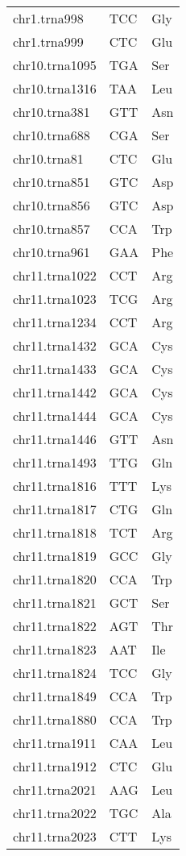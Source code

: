 \begin{longtable}{@{}l>{\collectcell\anticodon}l<{\endcollectcell}l@{}}
    chr1.trna998 & TCC & Gly \\
    chr1.trna999 & CTC & Glu \\
    chr10.trna1095 & TGA & Ser \\
    chr10.trna1316 & TAA & Leu \\
    chr10.trna381 & GTT & Asn \\
    chr10.trna688 & CGA & Ser \\
    chr10.trna81 & CTC & Glu \\
    chr10.trna851 & GTC & Asp \\
    chr10.trna856 & GTC & Asp \\
    chr10.trna857 & CCA & Trp \\
    chr10.trna961 & GAA & Phe \\
    chr11.trna1022 & CCT & Arg \\
    chr11.trna1023 & TCG & Arg \\
    chr11.trna1234 & CCT & Arg \\
    chr11.trna1432 & GCA & Cys \\
    chr11.trna1433 & GCA & Cys \\
    chr11.trna1442 & GCA & Cys \\
    chr11.trna1444 & GCA & Cys \\
    chr11.trna1446 & GTT & Asn \\
    chr11.trna1493 & TTG & Gln \\
    chr11.trna1816 & TTT & Lys \\
    chr11.trna1817 & CTG & Gln \\
    chr11.trna1818 & TCT & Arg \\
    chr11.trna1819 & GCC & Gly \\
    chr11.trna1820 & CCA & Trp \\
    chr11.trna1821 & GCT & Ser \\
    chr11.trna1822 & AGT & Thr \\
    chr11.trna1823 & AAT & Ile \\
    chr11.trna1824 & TCC & Gly \\
    chr11.trna1849 & CCA & Trp \\
    chr11.trna1880 & CCA & Trp \\
    chr11.trna1911 & CAA & Leu \\
    chr11.trna1912 & CTC & Glu \\
    chr11.trna2021 & AAG & Leu \\
    chr11.trna2022 & TGC & Ala \\
    chr11.trna2023 & CTT & Lys \\

\end{longtable}
